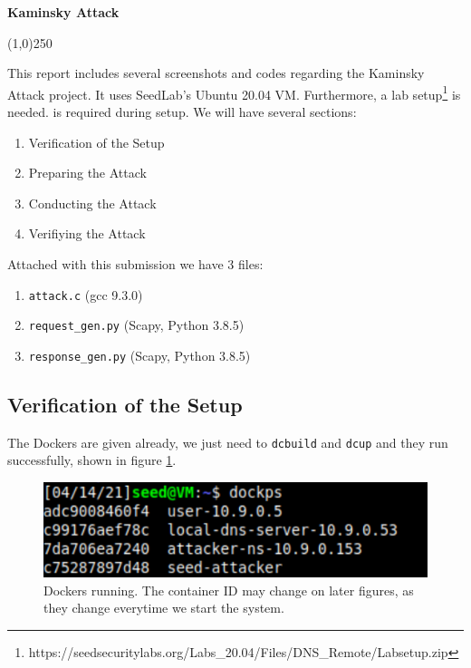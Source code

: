 \documentclass[12pt,reqno]{amsart}
\newcommand{\code}[1]{\texttt{#1}}
\begin{document}
\begin{center}
  \large\textbf{Kaminsky Attack} \\
\end{center}

\begin{center}
  \line(1,0){250}
\end{center}

This report includes several screenshots and codes regarding the Kaminsky Attack project. It uses SeedLab's Ubuntu 20.04 VM. Furthermore, a lab setup\footnote{https://seedsecuritylabs.org/Labs\_20.04/Files/DNS\_Remote/Labsetup.zip} is needed.
is required during setup. We will have several sections:
\begin{enumerate}
  \item Verification of the Setup
  \item Preparing the Attack
  \item Conducting the Attack
  \item Verifiying the Attack
\end{enumerate}

Attached with this submission we have 3 files:
\begin{enumerate}
  \item \code{attack.c} (gcc 9.3.0)
  \item \code{request\_gen.py} (Scapy, Python 3.8.5)
  \item \code{response\_gen.py} (Scapy, Python 3.8.5)
\end{enumerate}

\subsection*{Verification of the Setup}
The Dockers are given already, we just need to \code{dcbuild} and \code{dcup} and they run successfully, shown in figure \ref{fig:dockers}.  

\begin{figure}[h]
  \includegraphics[width=0.4\linewidth]{img/docker_ps.png}
  \caption{Dockers running. The container ID may change on later figures, as they change everytime we start the system.}
  \label{fig:dockers}
\end{figure}
\end{document}
